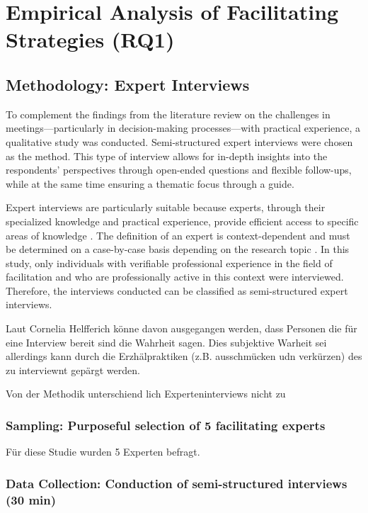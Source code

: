 \chapter{Empirical Analysis of Facilitating Strategies (RQ1)}
\label{ch:empirical-analysis-of-facilitating-strategies}
\section{Methodology: Expert Interviews}

To complement the findings from the literature review on the challenges in meetings—particularly in
decision-making processes—with practical experience, a qualitative study was conducted. Semi-structured
expert interviews were chosen as the method. This type of interview allows for in-depth insights into the
respondents’ perspectives through open-ended questions and flexible follow-ups, while at the same time
ensuring a thematic focus through a guide.

Expert interviews are particularly suitable because experts, through their specialized knowledge and
practical experience, provide efficient access to specific areas of knowledge \cite[p.
877]{baurHandbuchMethodenEmpirischen2022}. The definition of an expert is context-dependent and must be
determined on a case-by-case basis depending on the research topic \cite[p.
877]{baurHandbuchMethodenEmpirischen2022}. In this study, only individuals with verifiable professional
experience in the field of facilitation and who are professionally active in this context were interviewed.
Therefore, the interviews conducted can be classified as semi-structured expert interviews.

Laut Cornelia Helfferich \cite[p. 877]{baurHandbuchMethodenEmpirischen2022} könne davon ausgegangen werden,
dass Personen die für eine Interview bereit sind die Wahrheit sagen. Dies subjektive  Warheit sei allerdings
kann durch die Erzhälpraktiken (z.B. ausschmücken udn verkürzen) des zu interviewnt gepärgt werden.

Von der Methodik unterschiend lich Experteninterviews nicht zu
\subsection{Sampling: Purposeful selection of 5 facilitating experts}

Für diese Studie wurden 5 Experten befragt.

\subsection{Data Collection: Conduction of semi-structured interviews (30 min)}

